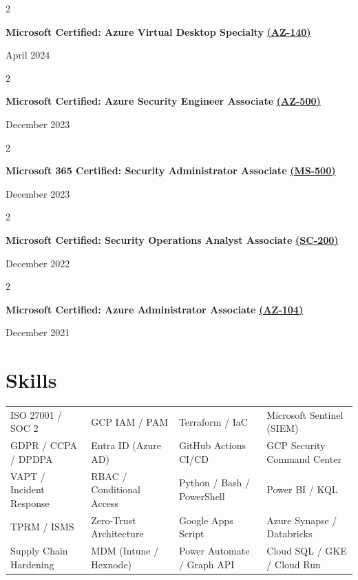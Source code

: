 \documentclass[10pt, letterpaper]{article}
\newenvironment{twocolentry}[2][]{
    \onecolentry
    \def\secondColumn{#2}
    \setcolumnwidth{\fill, 4.5 cm}
    \begin{paracol}{2}
}{
    \switchcolumn \raggedleft \secondColumn
    \end{paracol}
    \endonecolentry
}
\begin{document}
\vspace{0.05 cm}
\begin{twocolentry}{April 2024}
    \textbf{Microsoft Certified: Azure Virtual Desktop Specialty} \href{https://learn.microsoft.com/en-us/users/chinmaydhokmaqsoftware-5822/credentials/ccf1857230b93a53}{\textbf{(AZ-140)}}
\end{twocolentry}

\vspace{0.05 cm}
\begin{twocolentry}{December 2023}
    \textbf{Microsoft Certified: Azure Security Engineer Associate} \href{https://learn.microsoft.com/en-us/users/ChinmayDhokMAQSoftware-5822/credentials/AB3913F87040CE9}{\textbf{(AZ-500)}}
\end{twocolentry}

\vspace{0.05 cm}
\begin{twocolentry}{December 2023}
    \textbf{Microsoft 365 Certified: Security Administrator Associate} \href{https://learn.microsoft.com/en-us/users/chinmaydhokmaqsoftware-5822/credentials/c0ae1a2902b51750}{\textbf{(MS-500)}}
\end{twocolentry}

\vspace{0.05 cm}
\begin{twocolentry}{December 2022}
    \textbf{Microsoft Certified: Security Operations Analyst Associate} \href{https://learn.microsoft.com/en-us/users/ChinmayDhokMAQSoftware-5822/credentials/E22E4108C28D9FF2}{\textbf{(SC-200)}}
\end{twocolentry}

\vspace{0.05 cm}
\begin{twocolentry}{December 2021}
    \textbf{Microsoft Certified: Azure Administrator Associate} \href{https://learn.microsoft.com/en-us/users/chinmaydhokmaqsoftware-5822/credentials/ccf1857230b93a53}{\textbf{(AZ-104)}}
\end{twocolentry}


\section*{Skills}

\vspace{0.2cm}

\noindent\begin{tabular}{@{}llll}
ISO 27001 / SOC 2         & GCP IAM / PAM              & Terraform / IaC            & Microsoft Sentinel (SIEM) \\
GDPR / CCPA / DPDPA       & Entra ID (Azure AD)        & GitHub Actions CI/CD       & GCP Security Command Center \\
VAPT / Incident Response  & RBAC / Conditional Access   & Python / Bash / PowerShell & Power BI / KQL \\
TPRM / ISMS               & Zero-Trust Architecture     & Google Apps Script         & Azure Synapse / Databricks \\
Supply Chain Hardening    & MDM (Intune / Hexnode)      & Power Automate / Graph API & Cloud SQL / GKE / Cloud Run \\
\end{tabular}
\end{document}

